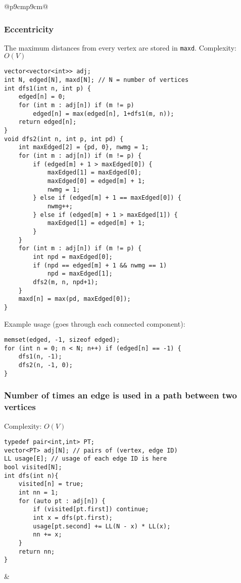 \documentclass[letterpaper]{article}
\begin{document}
\clearpage
\begin{tabular}{@{}p{9cm}p{9cm}@{}}

    \subsubsection{Eccentricity}

    The maximum distances from every vertex are stored in \texttt{maxd}. Complexity: $O\left(V\right)$

    \begin{lstlisting}
vector<vector<int>> adj;
int N, edged[N], maxd[N]; // N = number of vertices
int dfs1(int n, int p) {
	edged[n] = 0;
	for (int m : adj[n]) if (m != p)
		edged[n] = max(edged[n], 1+dfs1(m, n));
	return edged[n];
}
void dfs2(int n, int p, int pd) {
	int maxEdged[2] = {pd, 0}, nwmg = 1;
	for (int m : adj[n]) if (m != p) {
		if (edged[m] + 1 > maxEdged[0]) {
			maxEdged[1] = maxEdged[0];
			maxEdged[0] = edged[m] + 1;
			nwmg = 1;
		} else if (edged[m] + 1 == maxEdged[0]) {
			nwmg++;
		} else if (edged[m] + 1 > maxEdged[1]) {
			maxEdged[1] = edged[m] + 1;
		}
	}
	for (int m : adj[n]) if (m != p) {
		int npd = maxEdged[0];
		if (npd == edged[m] + 1 && nwmg == 1)
			npd = maxEdged[1];
		dfs2(m, n, npd+1);
	}
	maxd[n] = max(pd, maxEdged[0]);
}
\end{lstlisting}

    Example usage (goes through each connected component):

    \begin{lstlisting}
memset(edged, -1, sizeof edged);
for (int n = 0; n < N; n++) if (edged[n] == -1) {
	dfs1(n, -1);
	dfs2(n, -1, 0);
}
\end{lstlisting}

    \subsubsection{Number of times an edge is used in a path between two vertices}

    Complexity: $O\left(V\right)$

    \begin{lstlisting}
typedef pair<int,int> PT;
vector<PT> adj[N]; // pairs of (vertex, edge ID)
LL usage[E]; // usage of each edge ID is here
bool visited[N];
int dfs(int n){ 
	visited[n] = true;
	int nn = 1;
	for (auto pt : adj[n]) {
		if (visited[pt.first]) continue;
		int x = dfs(pt.first);
		usage[pt.second] += LL(N - x) * LL(x);
		nn += x;
	}
	return nn;
}
\end{lstlisting}
     &

\end{tabular}
\end{document}
